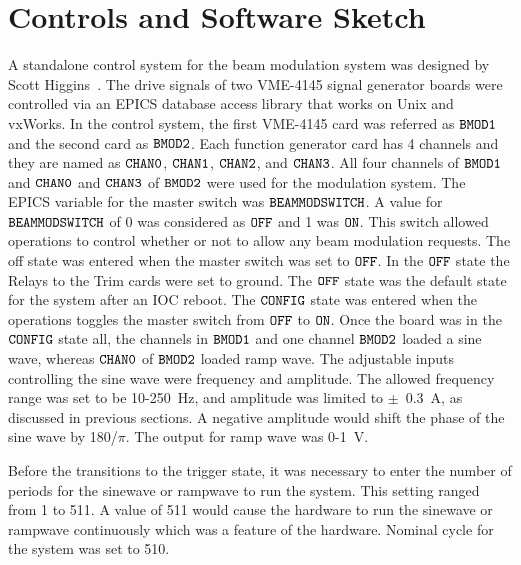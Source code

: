 \section{Controls and Software Sketch}
\label{Controls and Software Sketch}
A standalone control system for the beam modulation system was designed by Scott Higgins~\cite{nur_bm_controls, higgins_communication, nur_bm_GUI_proposal}. 
The drive signals of two VME-4145 signal generator boards were controlled via an EPICS database access library that works on Unix and vxWorks. 
In the control system, the first VME-4145 card was referred as ${\tt BMOD1}$ and the second card as ${\tt BMOD2}$. Each function generator card has 4 channels and they are named as ${\tt CHAN0}$, ${\tt CHAN1}$, ${\tt CHAN2}$, and ${\tt CHAN3}$. All four channels of ${\tt BMOD1}$ and ${\tt CHAN0}$ and ${\tt CHAN3}$ of ${\tt BMOD2}$ were used for the modulation system. 
The EPICS variable for the master switch was ${\tt BEAMMODSWITCH}$. A value for ${\tt BEAMMODSWITCH}$ of 0 was considered as ${\tt OFF}$ and 1 was ${\tt ON}$.  This switch allowed operations to control whether or not to allow any beam modulation requests. The off state was entered when the master switch was set to ${\tt OFF}$. In the ${\tt OFF}$ state the Relays to the Trim cards were set to ground. The ${\tt OFF}$ state was the default state for the system after an IOC reboot. The ${\tt CONFIG}$ state was entered when the operations toggles the master switch from ${\tt OFF}$ to ${\tt ON}$. Once the board was in the ${\tt CONFIG}$ state all, the channels in ${\tt BMOD1}$ and one channel ${\tt BMOD2}$ loaded a sine wave, whereas ${\tt CHAN0}$ of ${\tt BMOD2}$ loaded ramp wave. The adjustable inputs controlling the sine wave were frequency and amplitude. The allowed frequency range was set to be 10-250~Hz, and amplitude was limited to $\pm$~0.3~A, as discussed in previous sections. A negative amplitude would shift the phase of the sine wave by 180\degrees{}/$\pi$. The output for ramp wave was 0-1~V. 

Before the transitions to the trigger state, it was necessary to enter the number of periods for the sinewave or rampwave to run the system. This setting ranged from 1 to 511. A value of 511 would cause the hardware to run the sinewave or rampwave continuously which was a feature of the hardware. Nominal cycle for the system was set to 510. 

